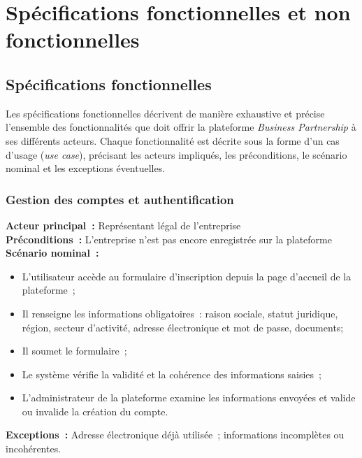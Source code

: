 \documentclass[12pt, a4paper, oneside]{report}
\begin{document}
	\section{Spécifications fonctionnelles et non fonctionnelles}
	\label{sec:specs_fonctionnelles}
	\subsection{Spécifications fonctionnelles}
	Les spécifications fonctionnelles décrivent de manière exhaustive
	et précise l'ensemble des fonctionnalités que doit offrir la
	plateforme \textit{Business Partnership} à ses différents acteurs.
	Chaque fonctionnalité est décrite sous la forme d'un cas d'usage
	(\textit{use case}), précisant les acteurs impliqués, les
	préconditions, le scénario nominal et les exceptions éventuelles.
	
	\subsubsection{Gestion des comptes et authentification}
	
	
		\textbf{Acteur principal~:} Représentant légal de l'entreprise \\
		\textbf{Préconditions~:} L'entreprise n'est pas encore enregistrée
		sur la plateforme \\
		\textbf{Scénario nominal~:}
		\begin{itemize}
			\item L'utilisateur accède au formulaire d'inscription depuis
			la page d'accueil de la plateforme~;
			\item Il renseigne les informations obligatoires~: raison sociale,
			statut juridique, région, secteur d'activité, adresse
			électronique et mot de passe, documents; 
			\item Il soumet le formulaire~;
			\item Le système vérifie la validité et la cohérence des
			informations saisies~;
			\item L'administrateur de la plateforme examine les informations envoyées et valide ou invalide la création du compte.
		\end{itemize}
		\textbf{Exceptions~:} Adresse électronique déjà utilisée~;
		informations incomplètes ou incohérentes.
	
	
	\vspace{0.5cm}
	
\end{document}
